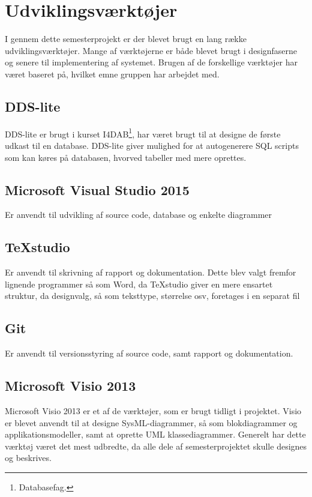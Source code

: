 \chapter{Udviklingsværktøjer}

I gennem dette semesterprojekt er der blevet brugt en lang række udviklingsværktøjer. Mange af værktøjerne er både blevet brugt i designfaserne og senere til implementering af systemet. Brugen af de forskellige værktøjer har været baseret på, hvilket emne gruppen har arbejdet med.

\section*{DDS-lite}
DDS-lite er brugt i kurset I4DAB\footnote{Databasefag.}, har været brugt til at designe de første udkast til en database. DDS-lite giver mulighed for at autogenerere SQL scripts som kan køres på databasen, hvorved tabeller med mere oprettes.

\section*{Microsoft Visual Studio 2015}
Er anvendt til udvikling af source code, database og enkelte diagrammer

\section*{TeXstudio}
Er anvendt til skrivning af rapport og dokumentation. Dette blev valgt fremfor lignende programmer så som Word, da TeXstudio giver en mere ensartet struktur, da designvalg, så som teksttype, størrelse osv, foretages i en separat fil

\section*{Git}
Er anvendt til versionsstyring af source code, samt rapport og dokumentation.

\section*{Microsoft Visio 2013}
Microsoft Visio 2013 er et af de værktøjer, som er brugt tidligt i projektet. Visio er blevet anvendt til at designe SysML-diagrammer, så som blokdiagrammer og applikationsmodeller, samt at oprette UML klassediagrammer. Generelt har dette værktøj været det mest udbredte, da alle dele af semesterprojektet skulle designes og beskrives.

